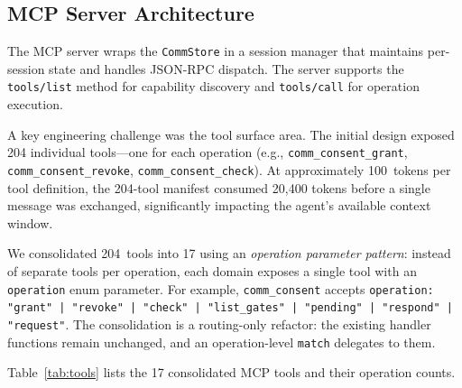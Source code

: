 \documentclass[10pt, twocolumn]{article}
\begin{document}
\subsection{MCP Server Architecture}
\label{sec:mcp}

The MCP server wraps the \texttt{CommStore} in a session manager that maintains per-session state and handles JSON-RPC dispatch. The server supports the \texttt{tools/list} method for capability discovery and \texttt{tools/call} for operation execution.

A key engineering challenge was the tool surface area. The initial design exposed 204 individual tools---one for each operation (e.g., \texttt{comm\_consent\_grant}, \texttt{comm\_consent\_revoke}, \texttt{comm\_consent\_check}). At approximately 100~tokens per tool definition, the 204-tool manifest consumed 20{,}400 tokens before a single message was exchanged, significantly impacting the agent's available context window.

We consolidated 204~tools into 17 using an \emph{operation parameter pattern}: instead of separate tools per operation, each domain exposes a single tool with an \texttt{operation} enum parameter. For example, \texttt{comm\_consent} accepts \texttt{operation: "grant" | "revoke" | "check" | "list\_gates" | "pending" | "respond" | "request"}. The consolidation is a routing-only refactor: the existing handler functions remain unchanged, and an operation-level \texttt{match} delegates to them.

Table~\ref{tab:tools} lists the 17 consolidated MCP tools and their operation counts.
\end{document}
